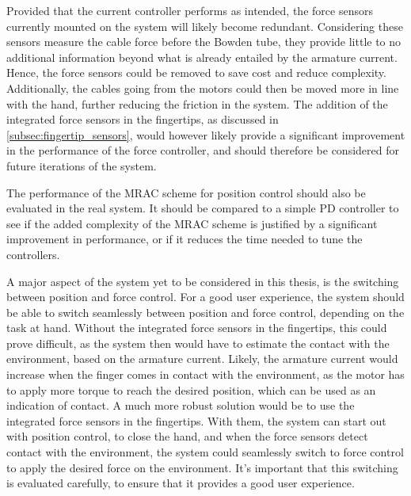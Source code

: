 Provided that the current controller performs as intended, the force sensors currently mounted on the system will likely become redundant. Considering these sensors measure the cable force before the Bowden tube, they provide little to no additional information beyond what is already entailed by the armature current. Hence, the force sensors could be removed to save cost and reduce complexity. Additionally, the cables going from the motors could then be moved more in line with the hand, further reducing the friction in the system. The addition of the integrated force sensors in the fingertips, as discussed in \cref{subsec:fingertip_sensors}, would however likely provide a significant improvement in the performance of the force controller, and should therefore be considered for future iterations of the system. 

The performance of the MRAC scheme for position control should also be evaluated in the real system. It should be compared to a simple PD controller to see if the added complexity of the MRAC scheme is justified by a significant improvement in performance, or if it reduces the time needed to tune the controllers.

A major aspect of the system yet to be considered in this thesis, is the switching between position and force control. For a good user experience, the system should be able to switch seamlessly between position and force control, depending on the task at hand. Without the integrated force sensors in the fingertips, this could prove difficult, as the system then would have to estimate the contact with the environment, based on the armature current. Likely, the armature current would increase when the finger comes in contact with the environment, as the motor has to apply more torque to reach the desired position, which can be used as an indication of contact. A much more robust solution would be to use the integrated force sensors in the fingertips. With them, the system can start out with position control, to close the hand, and when the force sensors detect contact with the environment, the system could seamlessly switch to force control to apply the desired force on the environment. It's important that this switching is evaluated carefully, to ensure that it provides a good user experience.
